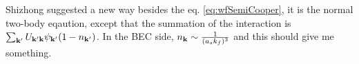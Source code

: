 Shizhong suggested a new way besides the eq. \eqref{eq:wfSemiCooper}, it is the normal two-body eqaution, except that the summation of the interaction is $\sum_{\mathbf{k}'}{}U_{\mathbf{k}'\mathbf{k}}\psi_{\mathbf{k}'}(1-n_{\mathbf{k}'})$.  In the BEC side, $n_{\mathbf{k}}\sim\frac{1}{(a_sk_f)^3}$ and this should give me something. 
